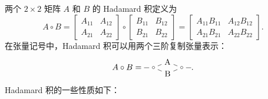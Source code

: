 两个 $2\times 2$ 矩阵 $A$ 和 $B$ 的 Hadamard 积定义为
\[
   \renewcommand*{\arraystretch}{1.3}
   A \circ B = \begin{bmatrix} A_{11} & A_{12} \\ A_{21} & A_{22} \end{bmatrix} \circ
              \begin{bmatrix} B_{11} & B_{12} \\ B_{21} & B_{22} \end{bmatrix}
            = \begin{bmatrix} A_{11}B_{11} & A_{12}B_{12} \\ A_{21}B_{21} & A_{22}B_{22} \end{bmatrix}
   .
\]
在张量记号中，Hadamard 积可以用两个三阶复制张量表示：
\[
   A \circ B
   =
   \begin{tikzpicture}[baseline=-.25em]
      \node (c0) at (0,0) {$\sbullet$};
      \node (A) at (.6,.25) {A};
      \node (B) at (.6,-.25) {B};
      \node (c1) at (1.2,0) {$\sbullet$};
      \draw (c0) -- (A) -- (c1);
      \draw (c0) -- (B) -- (c1);
      \draw (c0) -- ++(-.4,0);
      \draw (c1) -- ++(.4,0);
   \end{tikzpicture}
.
\]
Hadamard 积的一些性质如下：
